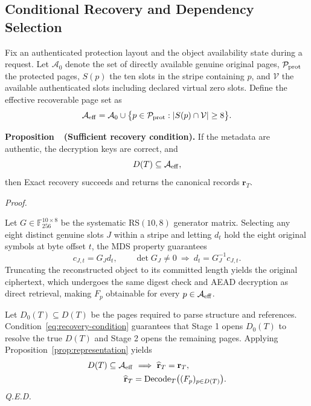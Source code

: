\documentclass[10pt,journal]{IEEEtran}
\newcounter{proposition}
\newenvironment{proposition}[1]{%
  \refstepcounter{proposition}\par\smallskip\noindent
  \textbf{Proposition~\theproposition\ (#1). }\ignorespaces
}{\par\smallskip}
\newenvironment{claimproof}{\par\noindent\emph{Proof. }\ignorespaces
}{\hfill\textit{Q.E.D.}\par\smallskip}
\begin{document}
\subsection{Conditional Recovery and Dependency Selection}\label{sec:recovery-condition}
Fix an authenticated protection layout and the object availability state during a request. Let $\mathcal A_0$ denote the set of directly available genuine original pages, $\mathcal P_{\rm prot}$ the protected pages, $S(p)$ the ten slots in the stripe containing $p$, and $\mathcal V$ the available authenticated slots including declared virtual zero slots. Define the effective recoverable page set as
\begin{equation}
\mathcal A_{\rm eff}=\mathcal A_0\cup
\bigl\{p\in\mathcal P_{\rm prot}:|S(p)\cap\mathcal V|\geq8\bigr\}.
\end{equation}
\begin{proposition}{Sufficient recovery condition}\label{prop:recovery}
If the metadata are authentic, the decryption keys are correct, and
\begin{equation}\label{eq:recovery-condition}
D(T)\subseteq\mathcal A_{\rm eff},
\end{equation}
then Exact recovery succeeds and returns the canonical records $\mathbf r_T$.
\end{proposition}
\begin{claimproof}
Let $G\in\mathbb F_{256}^{10\times8}$ be the systematic RS$(10,8)$ generator matrix. Selecting any eight distinct genuine slots $J$ within a stripe and letting $d_t$ hold the eight original symbols at byte offset $t$, the MDS property guarantees
\begin{equation}
c_{J,t}=G_Jd_t,\qquad\det G_J\ne0
\ \Longrightarrow\ d_t=G_J^{-1}c_{J,t}.
\end{equation}
Truncating the reconstructed object to its committed length yields the original ciphertext, which undergoes the same digest check and AEAD decryption as direct retrieval, making $F_p$ obtainable for every $p\in\mathcal A_{\rm eff}$.

Let $D_0(T)\subseteq D(T)$ be the pages required to parse structure and references. Condition~\eqref{eq:recovery-condition} guarantees that Stage 1 opens $D_0(T)$ to resolve the true $D(T)$ and Stage 2 opens the remaining pages. Applying Proposition~\ref{prop:representation} yields
\begin{equation}
\begin{aligned}
D(T)\subseteq\mathcal A_{\rm eff}&\ \Longrightarrow\ \widehat{\mathbf r}_T=\mathbf r_T,\\
\widehat{\mathbf r}_T&=\operatorname{Decode}_T\bigl((F_p)_{p\in D(T)}\bigr).
\end{aligned}
\end{equation}
\end{claimproof}
\end{document}
